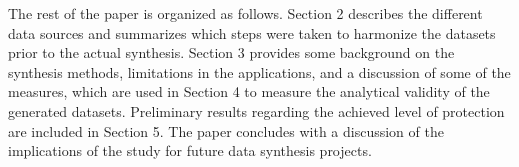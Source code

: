 
The rest of the paper is organized as follows. Section 2 describes the different data sources and summarizes which steps were taken to harmonize the datasets prior to the actual synthesis. Section 3 provides some background on the synthesis methods, limitations in the applications, and a discussion of some of the measures, which are used in Section 4 to measure the analytical validity of the generated datasets. Preliminary results regarding the achieved level of protection are included in Section 5. The paper concludes with a discussion of the implications of the study for future data synthesis projects.
